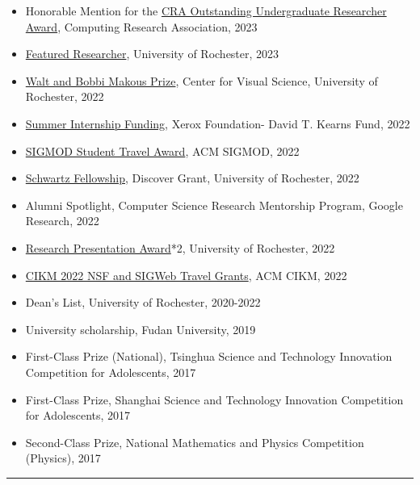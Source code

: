 \documentclass[10pt,letterpaper]{article}
\begin{document}
\begin{itemize}
\item  Honorable Mention for the \href{https://cra.org/about/awards/outstanding-undergraduate-researcher-award/}{CRA Outstanding Undergraduate Researcher Award}, Computing Research Association, 2023
\item \href{https://www.rochester.edu/college/ugresearch/}{Featured Researcher}, University of Rochester, 2023
  \item  \href{https://www.cvs.rochester.edu/training/makous_prize.html}{Walt and Bobbi Makous Prize}, Center for Visual Science, University of Rochester, 2022
 \item \href{https://www.rochester.edu/college/student-funding/summer-internship-funding.html}{Summer Internship Funding}, Xerox Foundation- David T. Kearns Fund, 2022
 \item \href{https://2022.sigmod.org/grants.shtml}{SIGMOD Student Travel Award}, ACM SIGMOD, 2022
 \item \href{https://www.rochester.edu/college/ugresearch/funding/discover-grant/index.html}{Schwartz Fellowship}, Discover Grant, University of Rochester, 2022
 \item Alumni Spotlight, Computer Science Research Mentorship Program, Google Research, 2022
  \item \href{https://www.rochester.edu/college/ugresearch/funding/rpa.html}{Research Presentation Award}*2, University of Rochester, 2022
  \item \href{https://www.cikm2022.org/nsf-travel-grants}{CIKM 2022 NSF and SIGWeb Travel Grants}, ACM CIKM, 2022
 \item  Dean’s List, University of Rochester, 2020-2022
 \item  University scholarship, Fudan University, 2019
 \item  First-Class Prize (National), Tsinghua Science and Technology Innovation Competition for Adolescents, 2017                                                                              
 \item  First-Class Prize, Shanghai Science and Technology Innovation Competition for Adolescents, 2017         
 \item  Second-Class Prize, National Mathematics and Physics Competition (Physics), 2017
 
 

\end{itemize}

\vspace{10mm}
\hrule
\end{document}
